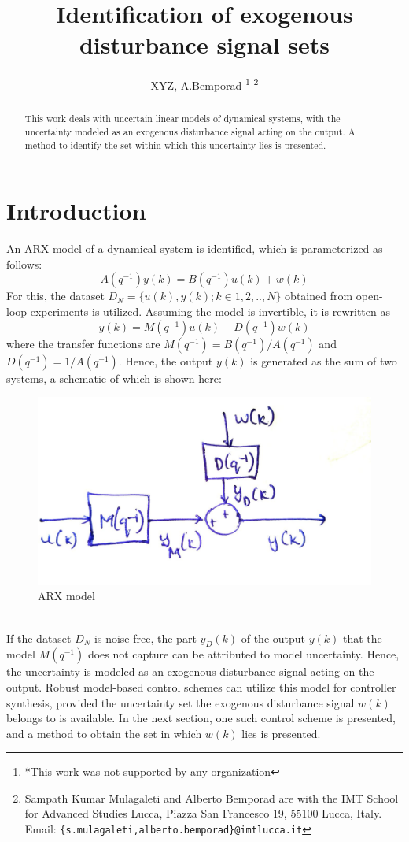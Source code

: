 \documentclass[letterpaper, 10 pt, conference]{ieeeconf}  %
\title{\LARGE \bf
Identification of exogenous disturbance signal sets
}
\author{XYZ, A.Bemporad%
\thanks{*This work was not supported by any organization}%
\thanks{Sampath Kumar Mulagaleti and Alberto Bemporad are with
		the IMT School for Advanced Studies Lucca, Piazza San Francesco 19,
		55100 Lucca, Italy. 
		 Email: 
	   {\tt\small \{s.mulagaleti,alberto.bemporad\}@imtlucca.it}}%
}
\begin{document}
\maketitle
\thispagestyle{empty}
\pagestyle{empty}


\begin{abstract}

This work deals with uncertain linear models of dynamical systems, with the uncertainty modeled as an exogenous disturbance signal acting on the output. A method to identify the set within which this uncertainty lies is presented. 

\end{abstract}


\section{Introduction}
An ARX model of a dynamical system is identified, which is parameterized as follows:
\begin{equation*} 
A(q^{-1})y(k)=B(q^{-1})u(k)+w(k)
\end{equation*}
 For this, the dataset $D_N=\{u(k),y(k);k\in1,2,..,N\}$ obtained from open-loop experiments is utilized. Assuming the model is invertible, it is rewritten as
 \begin{equation} 
 y(k)=M(q^{-1})u(k)+D(q^{-1})w(k)
 \label{tfmodel}
 \end{equation}
 where the transfer functions are $M(q^{-1})=B(q^{-1})/A(q^{-1})$ and $D(q^{-1})=1/A(q^{-1})$. Hence, the output $y(k)$ is generated as the sum of two systems, a schematic of which is shown here:
 \begin{figure}[h]
 	\hspace{20pt}
 	\includegraphics[scale=0.15]{schematic.jpeg}
 	\caption{ARX model}
 \end{figure} \\
If the dataset $D_N$ is noise-free, the part $y_D(k)$ of the output $y(k)$ that the model $M(q^{-1})$ does not capture can be attributed to model uncertainty. Hence, the uncertainty is modeled as an exogenous disturbance signal acting on the output. Robust model-based control schemes can utilize this model for controller synthesis, provided the uncertainty set the exogenous disturbance signal $w(k)$ belongs to is available. In the next section, one such control scheme is presented, and a method to obtain the set in which $w(k)$ lies is presented.
\end{document}

